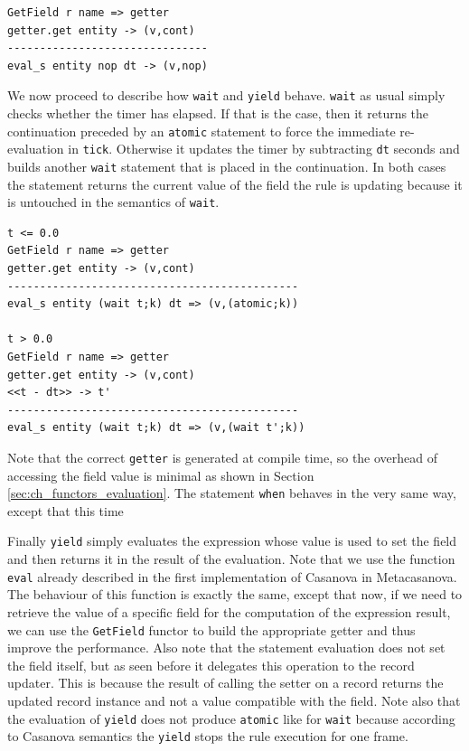 \begin{lstlisting}
GetField r name => getter
getter.get entity -> (v,cont)
-------------------------------
eval_s entity nop dt -> (v,nop)
\end{lstlisting}

We now proceed to describe how \texttt{wait} and \texttt{yield} behave. \texttt{wait} as usual simply checks whether the timer has elapsed. If that is the case, then it returns the continuation preceded by an \texttt{atomic} statement to force the immediate re-evaluation in \texttt{tick}. Otherwise it updates the timer by subtracting \texttt{dt} seconds and builds another \texttt{wait} statement that is placed in the continuation. In both cases the statement returns the current value of the field the rule is updating because it is untouched in the semantics of \texttt{wait}.

\begin{lstlisting}
t <= 0.0
GetField r name => getter
getter.get entity -> (v,cont)
---------------------------------------------
eval_s entity (wait t;k) dt => (v,(atomic;k))

t > 0.0
GetField r name => getter
getter.get entity -> (v,cont)
<<t - dt>> -> t'
---------------------------------------------
eval_s entity (wait t;k) dt => (v,(wait t';k))
\end{lstlisting}

\noindent
Note that the correct \texttt{getter} is generated at compile time, so the overhead of accessing the field value is minimal as shown in Section \ref{sec:ch_functors_evaluation}. The statement \texttt{when} behaves in the very same way, except that this time 


Finally \texttt{yield} simply evaluates the expression whose value is used to set the field and then returns it in the result of the evaluation. Note that we use the function \texttt{eval} already described in the first implementation of Casanova in Metacasanova. The behaviour of this function is exactly the same, except that now, if we need to retrieve the value of a specific field for the computation of the expression result, we can use the \texttt{GetField} functor to build the appropriate getter and thus improve the performance. Also note that the statement evaluation does not set the field itself, but as seen before it delegates this operation to the record updater. This is because the result of calling the setter on a record returns the updated record instance and not a value compatible with the field. Note also that the evaluation of \texttt{yield} does not produce \texttt{atomic} like for \texttt{wait} because according to Casanova semantics the \texttt{yield} stops the rule execution for one frame.

